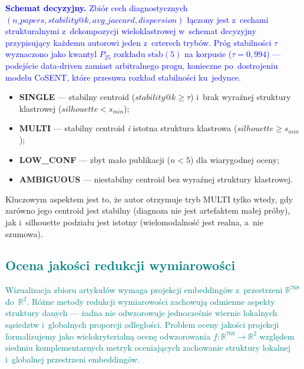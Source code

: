 \documentclass[a4paper,11pt,twocolumn]{article}
\newcommand{\hl}[1]{\textcolor{blue}{#1}}
\newcommand{\hlme}[1]{\textcolor{teal}{#1}}
\begin{document}
\hl{\textbf{Schemat decyzyjny.}}
\label{sec:adaptive}
\hl{Zbiór cech diagnostycznych
$(n\_papers, stability@k, avg\_jaccard, dispersion)$ łączony jest
z~cechami strukturalnymi z~dekompozycji wieloklastrowej w~schemat
decyzyjny przypisujący każdemu autorowi jeden z~czterech trybów.
Próg stabilności $\tau$ wyznaczono jako kwantyl $P_{25}$ rozkładu
$\overline{\text{stab}}(5)$ na korpusie ($\tau=0{,}994$) ---
podejście data-driven zamiast arbitralnego progu, konieczne po~dostrojeniu
modelu CoSENT, które przesuwa rozkład stabilności ku~jedynce.}
\begin{itemize}
  \item \textbf{SINGLE} --- stabilny centroid ($stability@k \geq \tau$)
        i~brak wyraźnej struktury klastrowej ($silhouette < s_{min}$);
  \item \textbf{MULTI} --- stabilny centroid \emph{i} istotna struktura
        klastrowa ($silhouette \geq s_{min}$);
  \item \textbf{LOW\_CONF} --- zbyt mało publikacji ($n < 5$) dla
        wiarygodnej oceny;
  \item \textbf{AMBIGUOUS} --- niestabilny centroid bez wyraźnej struktury
        klastrowej.
\end{itemize}

Kluczowym aspektem jest to, że autor otrzymuje tryb MULTI tylko wtedy,
gdy zarówno jego centroid jest stabilny (diagnoza nie jest artefaktem
małej próby), jak i~silhouette podziału jest istotny (wielomodalność
jest realna, a~nie szumowa).


\subsection{\hlme{Ocena jakości redukcji wymiarowości}}
\label{sec:dr_method}

\hlme{Wizualizacja zbioru artykułów wymaga projekcji embeddingów
z~przestrzeni $\mathbb{R}^{768}$ do~$\mathbb{R}^2$.
Różne metody redukcji wymiarowości zachowują odmienne aspekty
struktury danych --- żadna nie odwzorowuje jednocześnie wiernie
lokalnych sąsiedztw i~globalnych proporcji odległości.
Problem oceny jakości projekcji formalizujemy jako wielokryterialną
ocenę odwzorowania $f\colon \mathbb{R}^{768} \to \mathbb{R}^2$
względem siedmiu komplementarnych metryk oceniających zachowanie
struktury lokalnej i~globalnej przestrzeni embeddingów.}
\end{document}

